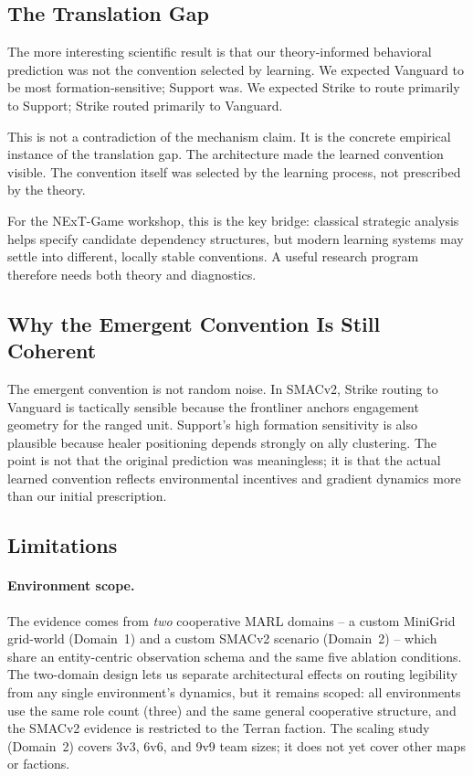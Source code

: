 \subsection{The Translation Gap}

The more interesting scientific result is that our theory-informed behavioral prediction was not the convention selected by learning. We expected Vanguard to be most formation-sensitive; Support was. We expected Strike to route primarily to Support; Strike routed primarily to Vanguard.

This is not a contradiction of the mechanism claim. It is the concrete empirical instance of the translation gap. The architecture made the learned convention visible. The convention itself was selected by the learning process, not prescribed by the theory.

For the NExT-Game workshop, this is the key bridge: classical strategic analysis helps specify candidate dependency structures, but modern learning systems may settle into different, locally stable conventions. A useful research program therefore needs both theory and diagnostics.

\subsection{Why the Emergent Convention Is Still Coherent}

The emergent convention is not random noise. In SMACv2, Strike routing to Vanguard is tactically sensible because the frontliner anchors engagement geometry for the ranged unit. Support's high formation sensitivity is also plausible because healer positioning depends strongly on ally clustering. The point is not that the original prediction was meaningless; it is that the actual learned convention reflects environmental incentives and gradient dynamics more than our initial prescription.

\subsection{Limitations}

\paragraph{Environment scope.} The evidence comes from \emph{two} cooperative MARL domains -- a custom MiniGrid grid-world (Domain~1) and a custom SMACv2 scenario (Domain~2) -- which share an entity-centric observation schema and the same five ablation conditions. The two-domain design lets us separate architectural effects on routing legibility from any single environment's dynamics, but it remains scoped: all environments use the same role count (three) and the same general cooperative structure, and the SMACv2 evidence is restricted to the Terran faction. The scaling study (Domain~2) covers 3v3, 6v6, and 9v9 team sizes; it does not yet cover other maps or factions.

